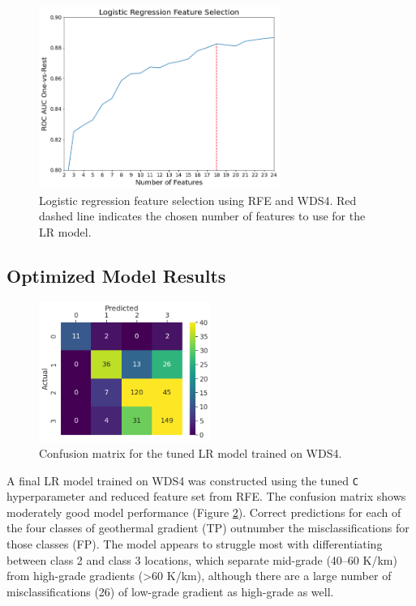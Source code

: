 \begin{figure}
\centering
\includegraphics[width=0.70\textwidth]{templates/images/Figure-LR_feature_selection.png}
\singlespacing
\caption[Logistic regression feature selection]{Logistic regression feature selection using RFE and WDS4. Red dashed line indicates the chosen number of features to use for the LR model.}
\label{fig:logreg_rfe}
\end{figure}

\subsection{Optimized Model Results}\label{ch5:lr_final_results}

\begin{figure}
\centering
\includegraphics[width=0.5\textwidth]{templates/images/Figure-LR-ConfusionMatrix.png}
\singlespacing
\caption[Logistic regression confusion matrix]{Confusion matrix for the tuned LR model trained on WDS4.}
\label{fig:logreg_conf_matrix}
\end{figure}
A final LR model trained on WDS4 was constructed using the tuned \verb|C| hyperparameter and reduced feature set from RFE. The confusion matrix shows moderately good model performance (Figure \ref{fig:logreg_conf_matrix}). Correct predictions for each of the four classes of geothermal gradient (TP) outnumber the misclassifications for those classes (FP). The model appears to struggle most with differentiating between class 2 and class 3 locations, which separate mid-grade (40--60 K/km) from high-grade gradients (>60 K/km), although there are a large number of misclassifications (26) of low-grade gradient as high-grade as well.

